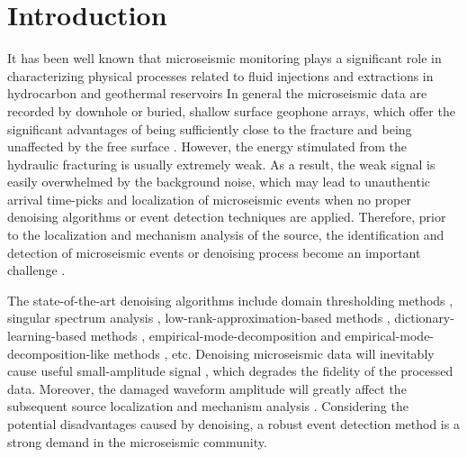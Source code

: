 \section{Introduction}
It has been well known that microseismic monitoring plays a significant role in characterizing physical processes related to fluid injections and extractions in hydrocarbon and geothermal reservoirs \citep{shapiro2006hydraulic,xia2013twin,huang2017low,huang2017unveiling,yangkang2018gji,yangkang2018gji2,mousavi2017automatic,vera2012microseismic} In general the microseismic data are recorded by downhole or buried, shallow surface geophone arrays, which offer the significant advantages of being sufficiently close to the fracture and being unaffected by the free surface \citep{warpinski2000analytic}. However, the energy stimulated from the hydraulic fracturing is usually extremely weak. As a result, the weak signal is easily overwhelmed by the background noise, which may lead to unauthentic arrival time-picks and localization of microseismic events when no proper denoising algorithms or event detection techniques are applied. Therefore, prior to the localization and mechanism analysis of the source, the identification and detection of microseismic events or denoising process become an important challenge \citep{mousavi2016adaptive,mousavi2016hybrid,liu2016application,forghani2013effective}.

The state-of-the-art denoising algorithms include  domain thresholding methods \citep{candes2006fast,zu2016periodically}, singular spectrum analysis \citep{vautard1992singular,chen2016simultaneous}, low-rank-approximation-based methods \citep{huang2016improved,xue2016simultaneous,shaohuan2017gji}, dictionary-learning-based methods \citep{elad2006image,chen2017fast}, empirical-mode-decomposition and empirical-mode-decomposition-like methods \citep{han2015microseismic,gomez2016simple,huang1998empirical}, etc. Denoising microseismic data will inevitably cause useful small-amplitude signal , which degrades the fidelity of the processed data. Moreover, the damaged waveform amplitude will greatly affect the subsequent source localization and mechanism analysis \citep{maxwell2010petroleum}. Considering the potential disadvantages caused by denoising, a robust event detection method is a strong demand in the microseismic community.

